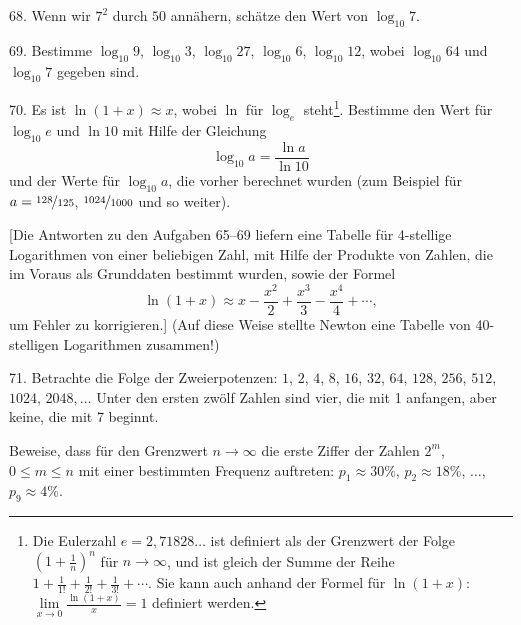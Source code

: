 \begin{problem}{68.}
	Wenn wir $7^2$ durch $50$ annähern, schätze den Wert von $\log_{10} 7$.
\end{problem}

\begin{problem}{69.}
	Bestimme $\log_{10} 9$, $\log_{10} 3$, $\log_{10} 27$, $\log_{10} 6$, $\log_{10} 12$, wobei $\log_{10} 64$ und $\log_{10} 7$ gegeben sind.
\end{problem}

\begin{problem}{70.}
	Es ist $\ln (1+x) \approx x$, wobei $\ln$ für $\log_e$ steht\footnote{Die Eulerzahl $e = 2{,}71828\dots$ ist definiert als der Grenzwert der Folge $\left(1+\frac1n\right)^n$ für $n\to \infty$, und ist gleich der Summe der Reihe
	$1+\frac 1{1!} +\frac 1{2!}+\frac 1{3!}+\dotsb$. Sie kann auch anhand der Formel für $\ln (1+x)$: $\lim\limits_{x\to 0}\frac{\ln(1+x)}{x} = 1$ definiert werden.}. Bestimme den Wert für $\log_{10} e$ und $\ln 10$ mit Hilfe der Gleichung
	\begin{equation*}
		\log_{10} a=\frac{\ln a}{\ln 10}
	\end{equation*}
	und der Werte für $\log_{10} a$, die vorher berechnet wurden (zum Beispiel für $a=\nicefrac{128}{125}$, $\nicefrac{1024}{1000}$ und so weiter).
	
	[Die Antworten zu den Aufgaben 65--69 liefern eine Tabelle für 4-stellige Logarithmen von einer beliebigen Zahl, mit Hilfe der Produkte von Zahlen, die im Voraus als Grunddaten bestimmt wurden, sowie der Formel
	\begin{equation*}
		\ln (1+x) \approx x-\frac{x^2}{2}+\frac{x^3}{3}-\frac{x^4}{4}+\dotsb,
	\end{equation*}
	um Fehler zu korrigieren.] (Auf diese Weise stellte Newton eine Tabelle von 40-stelligen Logarithmen zusammen!)
\end{problem}

\begin{problem}{71.}
	Betrachte die Folge der Zweierpotenzen: $1$, $2$, $4$, $8$, $16$, $32$, $64$, $128$, $256$, $512$, $1024$, $2048, \dotsc$ Unter den ersten zwölf Zahlen sind vier, die mit 1 anfangen, aber keine, die mit 7 beginnt.

	Beweise, dass für den Grenzwert $n \to \infty$ die erste Ziffer der Zahlen $2^m$,
	$0\leqslant m \leqslant n$ mit einer bestimmten Frequenz auftreten:
	$p_1 \approx 30\%$, $p_2 \approx 18\%$, $\dotsc$, $p_9 \approx 4\%$.
\end{problem}

